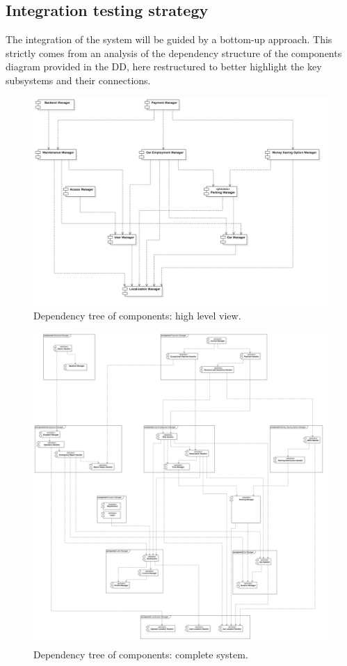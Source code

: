 \subsection{Integration testing strategy}
\label{sec:integration_testing_strategy}
	The integration of the system will be guided by a bottom-up approach. This strictly comes from an analysis of the dependency structure of the components diagram provided in the DD, here restructured to better highlight the key subsystems and their connections.
	\begin{figure}[h]
		\includegraphics[width=\textwidth, center]{img/integration_strategy/high_level_unravelled.png}
		\caption{Dependency tree of components: high level view.}
	\end{figure}
	\begin{figure}[h]
		\includegraphics[width=\textwidth, center]{img/integration_strategy/complete_unravelled.png}
		\caption{Dependency tree of components: complete system.}
	\end{figure}
	\FloatBarrier

